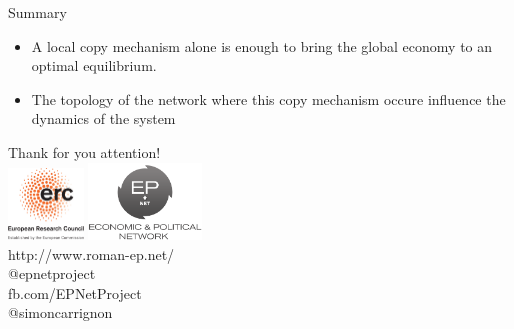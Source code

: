 \documentclass[12pt, handout=show,notes=show]{beamer}
\begin{document}
\begin{frame}{Summary}
\begin{itemize}
	\item A local copy mechanism alone is enough to bring the global economy to an optimal equilibrium.
		\vfill
	\item The topology of the network where this copy mechanism occure influence the dynamics of the system
		\vfill
\end{itemize}

\end{frame}

%	
%
\begin{frame}{}
    \begin{center}
	\huge
	Thank for you attention!\\\vfill
	\includegraphics[width=2cm]{images/LOGO-ERC.jpg} \hfil	\includegraphics[width=3cm]{images/epnetLogo.png}\\
		\vspace{1cm}
		\scriptsize
			http://www.roman-ep.net/\\
			@epnetproject\\
			fb.com/EPNetProject\\
			@simoncarrignon
	\end{center}


\end{frame}
\end{document}
